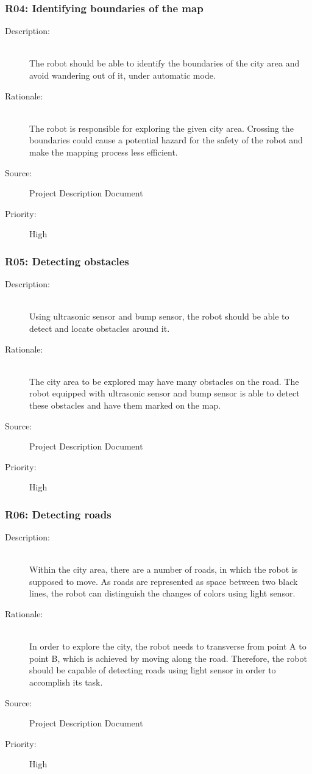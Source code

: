 \documentclass[titlepage]{article}
\begin{document}
\subsubsection{R04: Identifying boundaries of the map }
\begin{description}
\item[Description: ] \hfill \\ The robot should be able to identify the boundaries of the city area and avoid wandering out of it, under automatic mode.
\item[Rationale: ] \hfill \\The robot is responsible for exploring the given city area. Crossing the boundaries could cause a potential hazard for the safety of the robot and make the mapping process less efficient.
\item[Source: ] Project Description Document 
\item[Priority: ] High
\end{description}

\subsubsection{R05: Detecting obstacles }
\begin{description}
\item[Description: ] \hfill \\ Using ultrasonic sensor and bump sensor, the robot should be able to detect and locate obstacles around it.
\item[Rationale: ] \hfill \\The city area to be explored may have many obstacles on the road. The robot equipped with ultrasonic sensor and bump sensor is able to detect these obstacles and have them marked on the map.
\item[Source: ] Project Description Document 
\item[Priority: ] High
\end{description}

\subsubsection{R06: Detecting roads }
\begin{description}
\item[Description: ] \hfill \\ Within the city area, there are a number of roads, in which the robot is supposed to move. As roads are represented as space between two black lines, the robot can distinguish the changes of colors using light sensor.
\item[Rationale: ] \hfill \\In order to explore the city, the robot needs to transverse from point A to point B, which is achieved by moving along the road. Therefore, the robot should be capable of detecting roads using light sensor in order to accomplish its task.
\item[Source: ] Project Description Document 
\item[Priority: ] High
\end{description}
\end{document}
